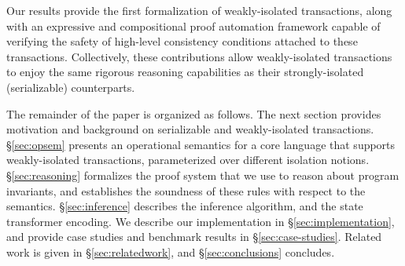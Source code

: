 \noindent Our results provide the first formalization of
weakly-isolated transactions, along with an expressive and
compositional proof automation framework capable of verifying the
safety of high-level consistency conditions attached to these
transactions.  Collectively, these contributions allow weakly-isolated
transactions to enjoy the same rigorous reasoning capabilities as
their strongly-isolated (serializable) counterparts.

The remainder of the paper is organized as follows. The next section
provides motivation and background on serializable and weakly-isolated
transactions. \S\ref{sec:opsem} presents an operational semantics for
a core language that supports weakly-isolated transactions,
parameterized over different isolation notions. \S\ref{sec:reasoning}
formalizes the proof system that we use to reason about program
invariants, and establishes the soundness of these rules with respect
to the semantics. \S\ref{sec:inference} describes the inference
algorithm, and the state transformer encoding.  We describe our
implementation in \S\ref{sec:implementation}, and provide case studies
and benchmark results in \S\ref{sec:case-studies}.  Related work is
given in \S\ref{sec:relatedwork}, and \S\ref{sec:conclusions} concludes.

